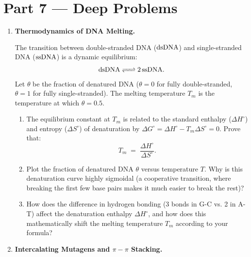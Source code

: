 \documentclass[12pt, a4paper]{book}
\begin{document}
\newpage

\section{Part 7 --- Deep Problems}

\begin{deepbox}
\begin{enumerate}[label=\textbf{D\arabic*.}]
  \item \textbf{Thermodynamics of DNA Melting.}
  
        The transition between double-stranded DNA ($\ce{dsDNA}$) and single-stranded DNA ($\ce{ssDNA}$) is a dynamic equilibrium:
        \[
          \ce{dsDNA <=> 2 ssDNA}.
        \]
        Let $\theta$ be the fraction of denatured DNA ($\theta = 0$ for fully double-stranded, $\theta = 1$ for fully single-stranded).
        The melting temperature $T_m$ is the temperature at which $\theta = 0.5$.
        \begin{enumerate}[label=(\alph*)]
          \item The equilibrium constant at $T_m$ is related to the standard enthalpy ($\Delta H^\circ$) and entropy ($\Delta S^\circ$) of denaturation by $\Delta G^\circ = \Delta H^\circ - T_m \Delta S^\circ = 0$.
                Prove that:
                \[
                  T_m \;=\; \frac{\Delta H^\circ}{\Delta S^\circ}.
                \]
          \item Plot the fraction of denatured DNA $\theta$ versus temperature $T$. Why is this denaturation curve highly sigmoidal (a cooperative transition, where breaking the first few base pairs makes it much easier to break the rest)?
          \item How does the difference in hydrogen bonding (3 bonds in G-C vs. 2 in A-T) affect the denaturation enthalpy $\Delta H^\circ$, and how does this mathematically shift the melting temperature $T_m$ according to your formula?
        \end{enumerate}

  \item \textbf{Intercalating Mutagens and $\pi-\pi$ Stacking.}
  

\end{enumerate}
\end{deepbox}
\end{document}
